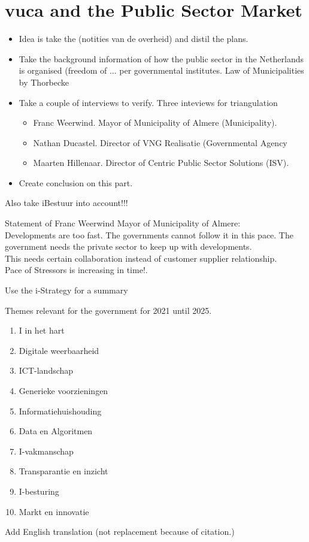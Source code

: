\chapter{\acrshort{vuca} and the Public Sector Market}
\label{ch:vucaandpublicsector}

\begin{itemize}
\item{Idea is take the (notities van de overheid) and distil the plans.}
\item{Take the background information of how the public sector in the Netherlands is organised (freedom of ... per governmental institutes. Law of Municipalities by Thorbecke }
\item{Take a couple of interviews to verify. Three inteviews for triangulation}
\begin{itemize}
	\item{Franc Weerwind. Mayor of Municipality of Almere (Municipality).}
	\item{Nathan Ducastel. Director of VNG Realisatie (Governmental Agency}
	\item{Maarten Hillenaar. Director of Centric Public Sector Solutions (ISV).}
\end{itemize}
\item{Create conclusion on this part.}
\end{itemize}

\begin{remark}
	Also take iBestuur into account!!!
\end{remark}

Statement of Franc Weerwind Mayor of Municipality of Almere:\\
Developments are too fast. The governments cannot follow it in this pace. The government needs the private sector to keep up with developments.\\
This needs certain collaboration instead of customer supplier relationship.\\
Pace of Stressors is increasing in time!.\\

\begin{remark}
	Use the i-Strategy for a summary \parencite{Digitaleoverheid}
\end{remark}

Themes relevant for the government for 2021 until 2025.

\begin{enumerate}
	\item{I in het hart}
	\item{Digitale weerbaarheid}
	\item{ICT-landschap}
	\item{Generieke voorzieningen}
	\item{Informatiehuishouding}
	\item{Data en Algoritmen}
	\item{I-vakmanschap}
	\item{Transparantie en inzicht}
	\item{I-besturing}
	\item{Markt en innovatie}
\end{enumerate}

\begin{remark}
	Add English translation (not replacement because of citation.)
\end{remark}